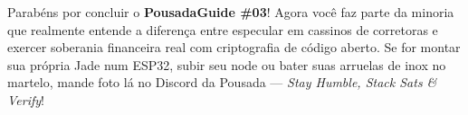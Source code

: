 \documentclass{pousadaguide}
\begin{document}
\divisor

\begin{pousadinha}
Parabéns por concluir o \textbf{PousadaGuide \#03}! Agora você faz parte da minoria que realmente entende a diferença entre especular em cassinos de corretoras e exercer soberania financeira real com criptografia de código aberto. Se for montar sua própria Jade num ESP32, subir seu node ou bater suas arruelas de inox no martelo, mande foto lá no Discord da Pousada — \emph{Stay Humble, Stack Sats \& Verify}!
\end{pousadinha}

\contracapa
\end{document}
